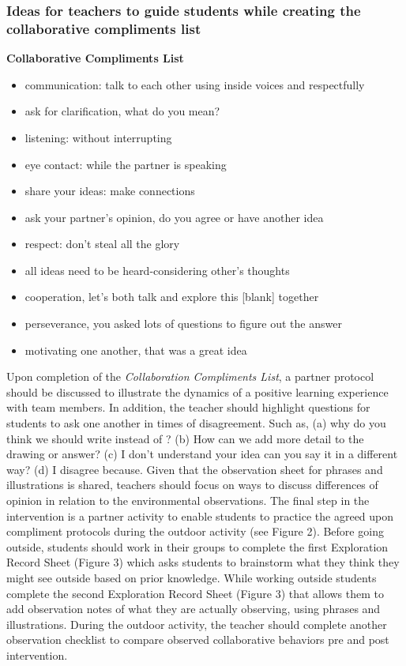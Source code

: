 \documentclass[11pt]{sig-alternate}
\begin{document}
\begin{large}
\subsubsection*{Ideas for teachers to guide students while creating the collaborative compliments list}
\textbf{Collaborative Compliments List}
\begin{itemize}
    \item communication: talk to each other using inside voices and respectfully
    \item ask for clarification, what do you mean?
    \item listening: without interrupting
    \item eye contact: while the partner is speaking
    \item share your ideas: make connections
    \item ask your partner's opinion, do you agree or have another idea
    \item respect: don't steal all the glory
    \item all ideas need to be heard-considering other's thoughts
    \item cooperation, let's both talk and explore this [blank] together
    \item perseverance, you asked lots of questions to figure out the answer
    \item motivating one another, that was a great idea
\end{itemize}

Upon completion of the \textit{Collaboration Compliments List}, a partner protocol should be discussed to illustrate the dynamics of a positive learning experience with team members. In addition, the teacher should highlight questions for students to ask one another in times of disagreement. Such as, (a) why do you think we should write instead of ? (b) How can we add more detail to the drawing or answer? (c) I don’t understand your idea can you say it in a different way? (d) I disagree because. Given that the observation sheet for phrases and illustrations is shared, teachers should focus on ways to discuss differences of opinion in relation to the environmental observations. The final step in the intervention is a partner activity to enable students to practice the agreed upon compliment protocols during the outdoor activity (see Figure 2). Before going outside, students should work in their groups to complete the first Exploration Record Sheet (Figure 3) which asks students to brainstorm what they think they might see outside based on prior knowledge. While working outside students complete the second Exploration Record Sheet (Figure 3) that allows them to add observation notes of what they are actually observing, using phrases and illustrations. During the outdoor activity, the teacher should complete another observation checklist to compare observed collaborative behaviors pre and post intervention.


\end{large}
\end{document}
